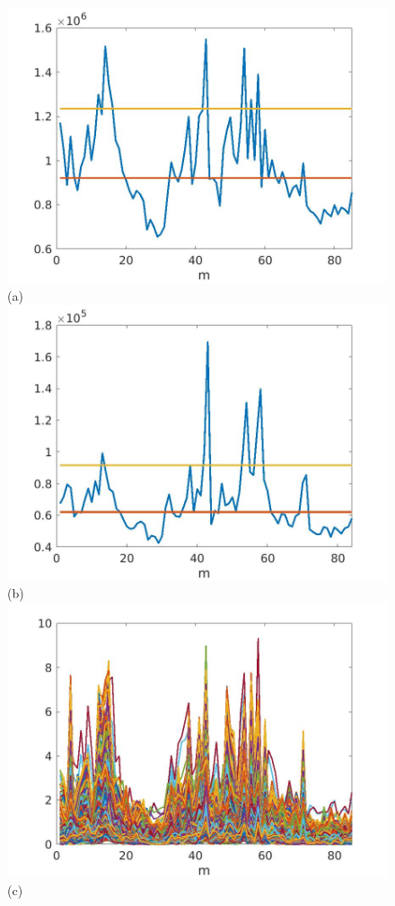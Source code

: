 \documentclass[journal]{IEEEtran}
\begin{document}
\begin{figure}[htp!]
\includegraphics[scale=.12]{../../figs/J3_euclid_squared_meandev}(a)
\includegraphics[scale=.12]{../../figs/consecdif_J3_euclid_squared_meandev}(b)\\
\includegraphics[scale=.12]{../../figs/J3_euclid_sqrdif_change_locations}(c)

\end{figure}
\end{document}
